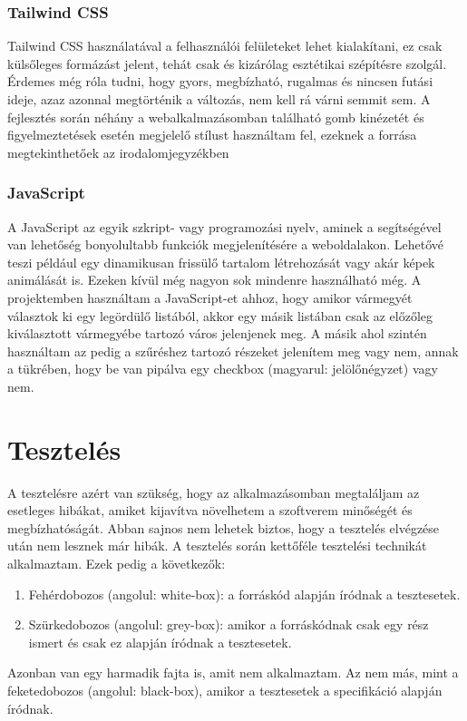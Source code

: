 \documentclass[]{thesis-ekf}
\theoremstyle{definition}
\theoremstyle{remark}
\begin{document}
	\subsection{Tailwind CSS}\label{sc-tailwind}
		Tailwind CSS használatával a felhasználói felületeket lehet kialakítani, ez csak külsőleges formázást jelent, tehát csak és kizárólag esztétikai szépítésre szolgál. Érdemes még róla tudni, hogy gyors, megbízható, rugalmas és nincsen futási ideje, azaz azonnal megtörténik a változás, nem kell rá várni semmit sem. A fejlesztés során néhány a webalkalmazásomban található gomb kinézetét és figyelmeztetések esetén megjelelő stílust használtam fel, ezeknek a forrása megtekinthetőek az irodalomjegyzékben \cite{tailwind, FlowBite}
	\subsection{JavaScript}\label{javascript}
		A JavaScript az egyik szkript- vagy programozási nyelv, aminek a segítségével van lehetőség bonyolultabb funkciók megjelenítésére a weboldalakon. Lehetővé teszi például egy dinamikusan frissülő tartalom létrehozását vagy akár képek animálását is. Ezeken kívül még nagyon sok mindenre használható még. A projektemben használtam a JavaScript-et ahhoz, hogy amikor vármegyét választok ki egy legördülő listából, akkor egy másik listában csak az előzőleg kiválasztott vármegyébe tartozó város jelenjenek meg. A másik ahol szintén használtam az pedig a szűréshez tartozó részeket jelenítem meg vagy nem, annak a tükrében, hogy be van pipálva egy checkbox (magyarul: jelölőnégyzet) vagy nem.
		
	\chapter{Tesztelés}
		A tesztelésre azért van szükség, hogy az alkalmazásomban megtaláljam az esetleges hibákat, amiket kijavítva növelhetem a szoftverem minőségét és megbízhatóságát. Abban sajnos nem lehetek biztos, hogy a tesztelés elvégzése után nem lesznek már hibák. A tesztelés során kettőféle tesztelési technikát alkalmaztam. Ezek pedig a következők:
		\begin{enumerate}
			\item Fehérdobozos (angolul: white-box): a forráskód alapján íródnak a tesztesetek.
			\item Szürkedobozos (angolul: grey-box): amikor a forráskódnak csak egy rész ismert és csak ez alapján íródnak a tesztesetek.
		\end{enumerate}
		Azonban van egy harmadik fajta is, amit nem alkalmaztam. Az nem más, mint a feketedobozos (angolul: black-box), amikor a tesztesetek a specifikáció alapján íródnak.
		\cite[26-29.~oldal]{Kusper}
\end{document}
